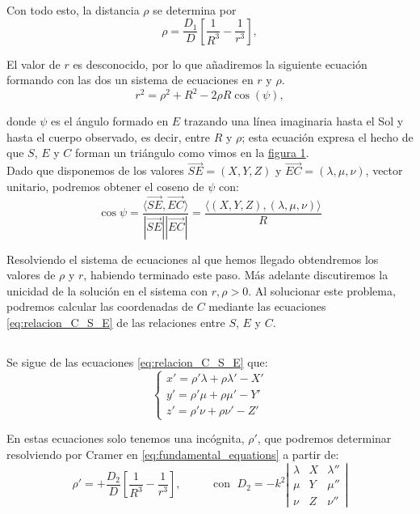 \documentclass[11pt]{article}
\begin{document}
Con todo esto, la distancia $\rho$ se determina por
\[
\rho = \frac{D_1}{D}[\frac{1}{R^3}-\frac{1}{r^3}],
\]

El valor de $r$ es desconocido, por lo que añadiremos la siguiente ecuación formando con las dos un sistema de ecuaciones en $r$ y $\rho$.
\[
r^2=\rho^2+R^2-2\rho R\cos(\psi),
\]

\noindent donde $\psi$ es el ángulo formado en $E$ trazando una línea imaginaria hasta el Sol y hasta el cuerpo observado, es decir, entre $R$ y $\rho$; esta ecuación expresa el hecho de que $S$, $E$ y $C$ forman un triángulo como vimos en la \hyperref[figure:1]{figura 1}.\\

Dado que disponemos de los valores $\overrightarrow{SE}=(X,Y,Z)$ y $\overrightarrow{EC}=(\lambda,\mu,\nu)$, vector unitario, podremos obtener el coseno de $\psi$ con:
\[
\cos{\psi}=\frac{\langle\overrightarrow{SE},\overrightarrow{EC}\rangle}{|\overrightarrow{SE}||\overrightarrow{EC}|}=\frac{\langle(X,Y,Z),(\lambda,\mu,\nu)\rangle}{R}
\]

Resolviendo el sistema de ecuaciones al que hemos llegado obtendremos los valores de $\rho$ y $r$, habiendo terminado este paso. Más adelante discutiremos la unicidad de la solución en el sistema con $r,\rho>0$. Al solucionar este problema, podremos calcular las coordenadas de $C$ mediante las ecuaciones \eqref{eq:relacion_C_S_E} de las relaciones entre $S$, $E$ y $C$.\\

\subsection{}
\label{subsec:velocity_component}
Se sigue de las ecuaciones \eqref{eq:relacion_C_S_E} que:
\[
\left\{
\begin{array}{l}
	x'=\rho'\lambda+\rho\lambda'-X'\\
	y'=\rho'\mu+\rho\mu'-Y'\\
	z'=\rho'\nu+\rho\nu'-Z'
\end{array}
\right.	
\]

En estas ecuaciones solo tenemos una incógnita, $\rho'$, que podremos determinar resolviendo por Cramer en \eqref{eq:fundamental_equations} a partir de:
\[
\rho'=+\frac{D_2}{D}[\frac{1}{R^3}-\frac{1}{r^3}],
\; \; \; \; \; \; \; \; \; \text{ con } \;
D_2 = -k^2
\left|
\begin{array}{ccc}
\lambda & X & \lambda''\\
\mu & Y & \mu''\\
\nu & Z & \nu''
\end{array}
\right|
\]
\end{document}
